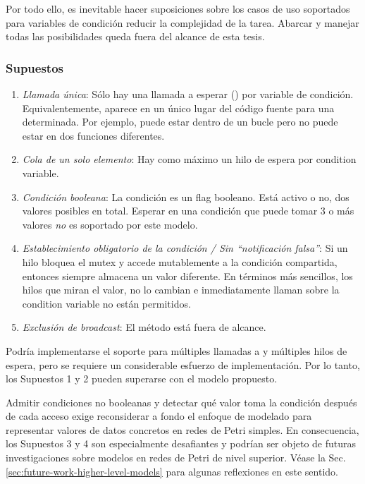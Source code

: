 Por todo ello, es inevitable hacer suposiciones sobre los casos de uso soportados
para variables de condición reducir la complejidad de la tarea.
Abarcar y manejar todas las posibilidades queda fuera del alcance de esta tesis.

\subsubsection{Supuestos}

\begin{enumerate}
      \item \emph{Llamada única}:
            Sólo hay una llamada a esperar () por variable de condición. Equivalentemente,
             aparece en un único lugar del código fuente para una  determinada.
            Por ejemplo, puede estar dentro de un bucle pero no puede estar en dos funciones
            diferentes.
      \item \emph{Cola de un solo elemento}: Hay como máximo un hilo de espera por condition variable.
      \item \emph{Condición booleana}: La condición es un flag booleano.
            Está activo o no, dos valores posibles en total.
            Esperar en una condición que puede tomar 3 o más valores \emph{no} es soportado por este modelo.
      \item \emph{Establecimiento obligatorio de la condición / Sin ``notificación falsa''}:
            Si un hilo bloquea el mutex y accede mutablemente a la condición compartida,
            entonces siempre almacena un valor diferente.
            En términos más sencillos, los hilos que miran el valor, no lo cambian
            e inmediatamente llaman  sobre la condition variable no están permitidos.
      \item \emph{Exclusión de broadcast}: El método  está fuera de alcance.
\end{enumerate}

Podría implementarse el soporte para múltiples llamadas a  y múltiples hilos de espera,
pero se requiere un considerable esfuerzo de implementación.
Por lo tanto, los Supuestos 1 y 2 pueden superarse con el modelo propuesto.

Admitir condiciones no booleanas y detectar qué valor toma la condición después de cada acceso
exige reconsiderar a fondo el enfoque de modelado
para representar valores de datos concretos en redes de Petri simples.
En consecuencia, los Supuestos 3 y 4 son especialmente desafiantes y podrían ser objeto de
futuras investigaciones sobre modelos en redes de Petri de nivel superior.
Véase la Sec. \ref{sec:future-work-higher-level-models} para algunas reflexiones en este sentido.

